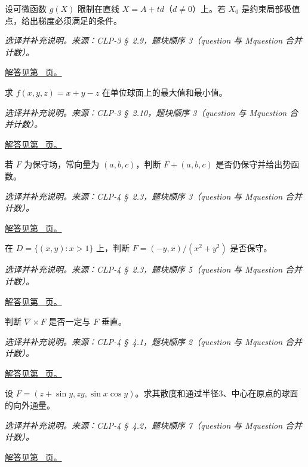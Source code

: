 \documentclass[UTF8,12pt,a4paper,fontset=fandol]{ctexart}
\begin{document}
\begin{example}[直线约束下的极值必要条件]\label{ex:c45q18}
设可微函数 $g(X)$ 限制在直线 $X=A+td$（$d\ne0$）上。若 $X_0$ 是约束局部极值点，给出梯度必须满足的条件。
\par\textit{选译并补充说明。来源：CLP-3 \S~2.9，题块顺序 3（question 与 Mquestion 合并计数）。}\par\hyperref[ans:c45q18]{解答见第~\pageref{ans:c45q18} 页。}
\end{example}
\begin{example}[球面上的线性函数]\label{ex:c45q19}
求 $f(x,y,z)=x+y-z$ 在单位球面上的最大值和最小值。
\par\textit{选译并补充说明。来源：CLP-3 \S~2.10，题块顺序 3（question 与 Mquestion 合并计数）。}\par\hyperref[ans:c45q19]{解答见第~\pageref{ans:c45q19} 页。}
\end{example}
\begin{example}[保守场加常向量]\label{ex:c45q20}
若 $F$ 为保守场，常向量为 $(a,b,c)$，判断 $F+(a,b,c)$ 是否仍保守并给出势函数。
\par\textit{选译并补充说明。来源：CLP-4 \S~2.3，题块顺序 3（question 与 Mquestion 合并计数）。}\par\hyperref[ans:c45q20]{解答见第~\pageref{ans:c45q20} 页。}
\end{example}
\begin{example}[限制定义域后恢复势函数]\label{ex:c45q21}
在 $D=\{(x,y):x>1\}$ 上，判断 $F=(-y,x)/(x^2+y^2)$ 是否保守。
\par\textit{选译并补充说明。来源：CLP-4 \S~2.3，题块顺序 5（question 与 Mquestion 合并计数）。}\par\hyperref[ans:c45q21]{解答见第~\pageref{ans:c45q21} 页。}
\end{example}
\begin{example}[旋度未必垂直原场]\label{ex:c45q22}
判断 $\nabla\times F$ 是否一定与 $F$ 垂直。
\par\textit{选译并补充说明。来源：CLP-4 \S~4.1，题块顺序 2（question 与 Mquestion 合并计数）。}\par\hyperref[ans:c45q22]{解答见第~\pageref{ans:c45q22} 页。}
\end{example}
\begin{example}[由对称性得到零通量]\label{ex:c45q23}
设 $F=(z+\sin y,zy,\sin x\cos y)$。求其散度和通过半径3、中心在原点的球面的向外通量。
\par\textit{选译并补充说明。来源：CLP-4 \S~4.2，题块顺序 7（question 与 Mquestion 合并计数）。}\par\hyperref[ans:c45q23]{解答见第~\pageref{ans:c45q23} 页。}
\end{example}
\end{document}
